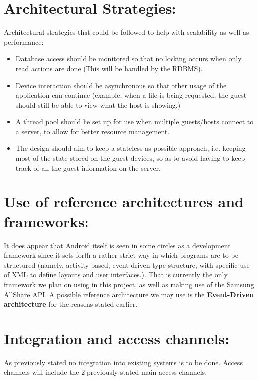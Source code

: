 \documentclass[12pt]{article}
\begin{document}
\section{Architectural Strategies:}
Architectural strategies that could be followed to help with scalability as well as performance:
\begin{itemize}
\item Database access should be monitored so that no locking occurs when only read actions are done (This will be handled by the RDBMS).
\item Device interaction should be asynchronous so that other usage of the application can continue (example, when a file is being requested, the guest should still be able to view what the host is showing.)
\item A thread pool should be set up for use when multiple guests/hosts connect to a server, to allow for better resource management.
\item The design should aim to keep a stateless as possible approach, i.e. keeping most of the state stored on the guest devices, so as to avoid having to keep track of all the guest information on the server.

\end{itemize}


\section{Use of reference architectures and\\ frameworks:}
It does appear that Android itself is seen in some circles as a development framework since it sets forth a rather strict way in which programs are to be structured (namely, activity based, event driven type structure, with specific use of XML to define layouts and user interfaces.).
That is currently the only framework we plan on using in this project, as well as making use of the Samsung AllShare API.
A possible reference architecture we may use is the \textbf{Event-Driven architecture} for the reasons stated earlier.

\newpage
\section{Integration and access channels:}
As previously stated no integration into existing systems is to be done.
Access channels will include the 2 previously stated main access channels.
\end{document}

